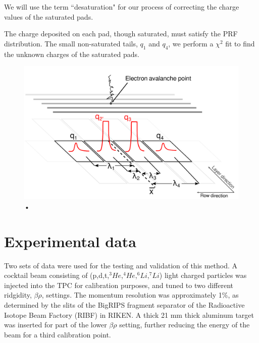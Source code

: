 \documentclass[review]{elsarticle}
\begin{document}
We will use the term ``desaturation" for our process of correcting the charge values of the saturated pads.

The charge deposited on each pad, though saturated, must satisfy the PRF distribution. The small non-saturated tails, $q_{1}$ and $q_{4}$, we perform a $\chi^2$ fit to find the unknown charges of the saturated pads. 


\begin{figure}[H]
\includegraphics[width=\linewidth]{saturated_pads}
\caption{•}
\label{fig:satpad}
\end{figure}

\section{Experimental data}
Two sets of data were used for the testing and validation of this method. A cocktail beam consisting of (p,d,t,${}^3He$,${}^4He$,${}^6Li$,${}^7Li$) light charged particles was injected into the TPC for calibration purposes, and tuned to two different ridgidity, $\beta\rho$, settings. The momentum resolution was approximately 1\%, as determined by the slits of the BigRIPS fragment separator of the Radioactive Isotope Beam Factory (RIBF) in RIKEN. A thick 21 mm thick aluminum target was inserted for part of the lower $\beta\rho$ setting, further reducing the energy of the beam for a third calibration point. 
\end{document}
